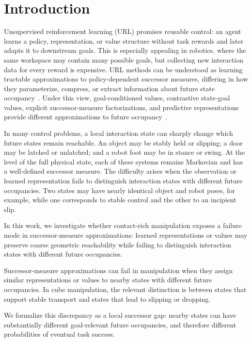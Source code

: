\section{Introduction}

Unsupervised reinforcement learning (URL) promises reusable control: an agent learns a policy, representation, or value structure without task rewards and later adapts it to downstream goals.
This is especially appealing in robotics, where the same workspace may contain many possible goals, but collecting new interaction data for every reward is expensive.
URL methods can be understood as learning tractable approximations to policy-dependent successor measures, differing in how they parameterize, compress, or extract information about future state occupancy~\citep{agarwal-rlj25a}.
Under this view, goal-conditioned values, contrastive state-goal values, explicit successor-measure factorizations, and predictive representations provide different approximations to future occupancy~\citep{eysenbach-iclr21a,eysenbach-neurips22a,ma-neurips22a,touati-neurips21a,touati-iclr23a}.

In many control problems, a local interaction state can sharply change which future states remain reachable.
An object may be stably held or slipping; a door may be latched or unlatched; and a robot foot may be in stance or swing.
At the level of the full physical state, each of these systems remains Markovian and has a well-defined successor measure.
The difficulty arises when the observation or learned representation fails to distinguish interaction states with different future occupancies.
Two states may have nearly identical object and robot poses, for example, while one corresponds to stable control and the other to an incipient slip.

In this work, we investigate whether contact-rich manipulation exposes a failure mode in successor-measure approximations: 
learned representations or values may preserve coarse geometric reachability while failing to distinguish interaction states with different future occupancies.
\begin{hypothesis}
Successor-measure approximations can fail in manipulation when they assign similar representations or values to nearby states with different future occupancies.
In cube manipulation, the relevant distinction is between states that support stable transport and states that lead to slipping or dropping.
\end{hypothesis}
We formalize this discrepancy as a local successor gap: nearby states can have substantially different goal-relevant future occupancies, and therefore different probabilities of eventual task success.

